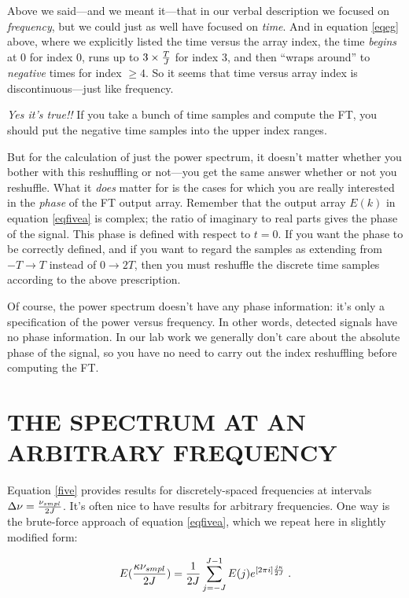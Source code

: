\documentclass[preprint]{aastex}
\begin{document}
\label{noncontinuous}

	Above we said---and we meant it---that in our verbal description
we focused on {\it frequency}, but we could just as well have focused
on {\it time}. And in equation \ref{eqeg} above, where we explicitly listed
the time versus the array index, the time {\it begins} at $0$ for index 0, runs 
up to $3 \times {T \over J}$ for index $3$,
and then ``wraps around'' to {\it negative} times for index $\ge 4$.
So it seems that time versus array index is discontinuous---just like
frequency. 

	{\it Yes it's true!!} If you take a bunch of time samples and
compute the FT, you should put the negative time samples into the upper
index ranges. 

	But for the calculation of just the power spectrum, it doesn't
matter whether you bother with this reshuffling or not---you get the
same answer whether or not you reshuffle.  What it {\it does} matter for
is the cases for which you are really interested in the {\it phase} of
the FT output array.  Remember that the output array $E(k)$ in equation
\ref{eqfivea} is complex; the ratio of imaginary to real parts gives the
phase of the signal.  This phase is defined with respect to $t=0$.  If
you want the phase to be correctly defined, and if you want to regard
the samples as extending from $-T \rightarrow T$ instead of $0
\rightarrow 2T$, then you must reshuffle the discrete time samples
according to the above prescription. 

	Of course, the power spectrum doesn't have any phase
information: it's only a specification of the power versus frequency. 
In other words, detected signals have no phase information.  In our lab
work we generally don't care about the absolute phase of the signal, so
you have no need to carry out the index reshuffling before computing the
FT. 

\section{THE SPECTRUM AT AN ARBITRARY FREQUENCY}

	Equation \ref{five} provides results for discretely-spaced
frequencies at intervals $\Delta \nu = {\nu_{smpl} \over 2J}$. It's
often nice to have results for arbitrary frequencies. One way is the
brute-force approach  of equation \ref{eqfivea}, which we repeat here in
slightly modified form:

\begin{equation} \label{eqfiveb}
E({\kappa \nu_{smpl} \over 2J}) = {1 \over 2J} \sum_{j=-J}^{J-1}  E(j)
e^{[2 \pi i] {j\kappa \over 2J} } \; .
\end{equation}
\end{document}

